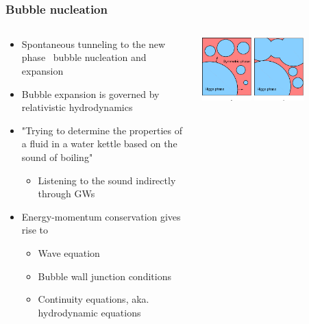 \begin{frame}
\begin{columns}
\begin{column}{0.5\textwidth}
        \\
    \end{column}
    \end{columns}
\end{frame}

\begin{frame}
    \frametitle{Bubble nucleation}
    \begin{columns}
    \begin{column}{0.6\textwidth}
        \begin{itemize}
            \item Spontaneous tunneling to the new phase \textrightarrow \ bubble nucleation and expansion
            \item Bubble expansion is governed by relativistic hydrodynamics
            \item "Trying to determine the properties of a fluid in a water kettle based on the sound of boiling"
            \begin{itemize}
                \item Listening to the sound indirectly through GWs
            \end{itemize}
            \item Energy-momentum conservation gives rise to
            \begin{itemize}
                \item Wave equation
                \item Bubble wall junction conditions
                \item Continuity equations, aka. hydrodynamic equations
            \end{itemize}
        \end{itemize}
    \end{column}
    \begin{column}{0.4\textwidth}
        \includegraphics[width=0.33\textwidth]{../fig/HiggsBubble1}%
        \includegraphics[width=0.33\textwidth]{../fig/HiggsBubble2}%

\end{column}
\end{columns}
\end{frame}
